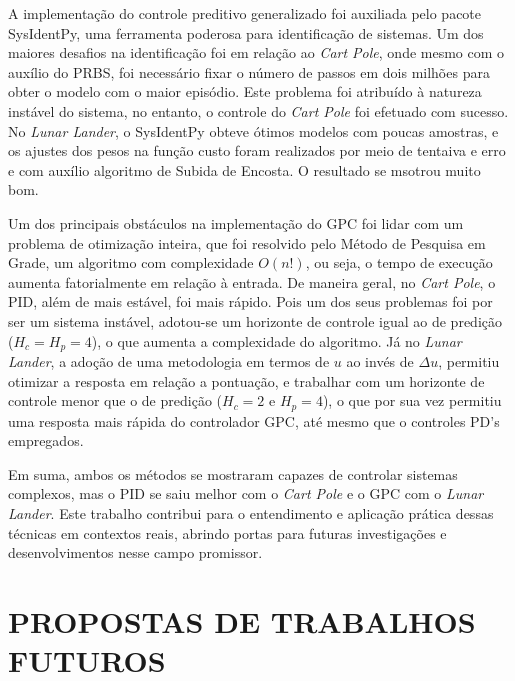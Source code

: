 \documentclass[12pt,           %
a4paper,                       %
openany,                       %
oneside,                       %
chapter=TITLE,                 %
english,                       %
spanish,                       %
brazil,                        %
sumario=tradicional]{abntex2}  %
\begin{document}
\begin{OnehalfSpace}
A implementação do controle preditivo generalizado foi auxiliada pelo pacote SysIdentPy, uma ferramenta poderosa para identificação de sistemas. Um dos maiores desafios na identificação foi em relação ao \textit{Cart Pole}, onde mesmo com o auxílio do PRBS, foi necessário fixar o número de passos em dois milhões para obter o modelo com o maior episódio. Este problema foi atribuído à natureza instável do sistema, no entanto, o controle do \textit{Cart Pole} foi efetuado com sucesso. No \textit{Lunar Lander}, o SysIdentPy obteve ótimos modelos com poucas amostras, e os ajustes dos pesos na função custo foram realizados por meio de tentaiva e erro e com auxílio algoritmo de Subida de Encosta. O resultado se msotrou muito bom.

Um dos principais obstáculos na implementação do GPC foi lidar com um problema de otimização inteira, que foi resolvido pelo Método de Pesquisa em Grade, um algoritmo com complexidade $O(n!)$, ou seja, o tempo de execução aumenta fatorialmente em relação à entrada. De maneira geral, no \textit{Cart Pole}, o PID, além de mais estável, foi mais rápido. Pois um dos seus problemas foi por ser um sistema instável, adotou-se um horizonte de controle igual ao de predição ($H_c=H_p=4$), o que aumenta a complexidade do algoritmo. Já no \textit{Lunar Lander}, a adoção de uma metodologia em termos de $u$ ao invés de $\Delta u$, permitiu otimizar a resposta em relação a pontuação, e trabalhar com um horizonte de controle menor que o de predição ($H_c=2$ e $H_p=4$), o que por sua vez permitiu uma resposta mais rápida do controlador GPC, até mesmo que o controles PD's empregados.

Em suma, ambos os métodos se mostraram capazes de controlar sistemas complexos, mas o PID se saiu melhor com o \textit{Cart Pole} e o GPC com o \textit{Lunar Lander}. Este trabalho contribui para o entendimento e aplicação prática dessas técnicas em contextos reais, abrindo portas para futuras investigações e desenvolvimentos nesse campo promissor.\\


{\let\clearpage\relax\par \chapter{PROPOSTAS DE TRABALHOS FUTUROS}}
\label{ch:propostas}                        %



\end{OnehalfSpace}
\end{document}
